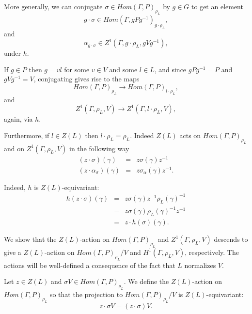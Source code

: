 More generally, we can conjugate $\sigma\in Hom(\Gamma, P)_{\rho_L}$ by $g \in G$ to get an element 
\begin{displaymath}
  g \cdot \sigma \in Hom(\Gamma, gPg^{-1})_{g\cdot\rho_L},
\end{displaymath}
and
\begin{displaymath}
  \alpha_{g \cdot \sigma} \in Z^1(\Gamma, g\cdot\rho_L, gVg^{-1}),
\end{displaymath}
under $h$.

If $g\in P$ then $g=vl$ for some $v\in V$ and some $l\in L$, and since $gPg^{-1} = P$ and $gVg^{-1} = V$, conjugating gives rise to the maps
\begin{displaymath}
  Hom(\Gamma, P)_{\rho_L} \rightarrow Hom(\Gamma, P)_{l\cdot\rho_L},
\end{displaymath}
and
\begin{displaymath}
  Z^1(\Gamma, \rho_L, V)\rightarrow Z^1(\Gamma, l\cdot\rho_L, V),
\end{displaymath}
again, via $h$.

Furthermore, if $l\in Z(L)$ then $l\cdot\rho_L = \rho_L$. Indeed $Z(L)$ acts on $Hom(\Gamma, P)_{\rho_L}$ and on $Z^1(\Gamma, \rho_L, V)$ in the following way
\begin{eqnarray*}
  (z \cdot \sigma) (\gamma) &=& z \sigma(\gamma) z^{-1} \\
  (z \cdot \alpha_\sigma) (\gamma) &=&  z \sigma_\alpha(\gamma) z^{-1}.
\end{eqnarray*}

Indeed, $h$ is $Z(L)$-equivariant:
\begin{eqnarray*}
  h(z \cdot \sigma)(\gamma) &=&  z \sigma(\gamma) z^{-1} \rho_L(\gamma)^{-1} \\
  &=& z \sigma(\gamma) \rho_L(\gamma)^{-1} z^{-1} \\
  &=& z \cdot h(\sigma)(\gamma).
\end{eqnarray*}

We show that the $Z(L)$-action on $Hom(\Gamma, P)_{\rho_L}$ and $Z^1(\Gamma, \rho_L, V)$ descends to give a $Z(L)$-action on $Hom(\Gamma, P)_{\rho_L}/V$ and $H^1(\Gamma, \rho_L, V)$, respectively. The actions will be well-defined a consequence of the fact that $L$ normalizes $V$.

Let $z \in Z(L)$ and $\sigma V \in Hom(\Gamma, P)_{\rho_L}$. We define the $Z(L)$-action on $Hom(\Gamma, P)_{\rho_L}$ so that the projection to $Hom(\Gamma, P)_{\rho_L}/V$ is $Z(L)$-equivariant:
\begin{displaymath}
  z \cdot \sigma V = (z \cdot \sigma) V.
\end{displaymath}

